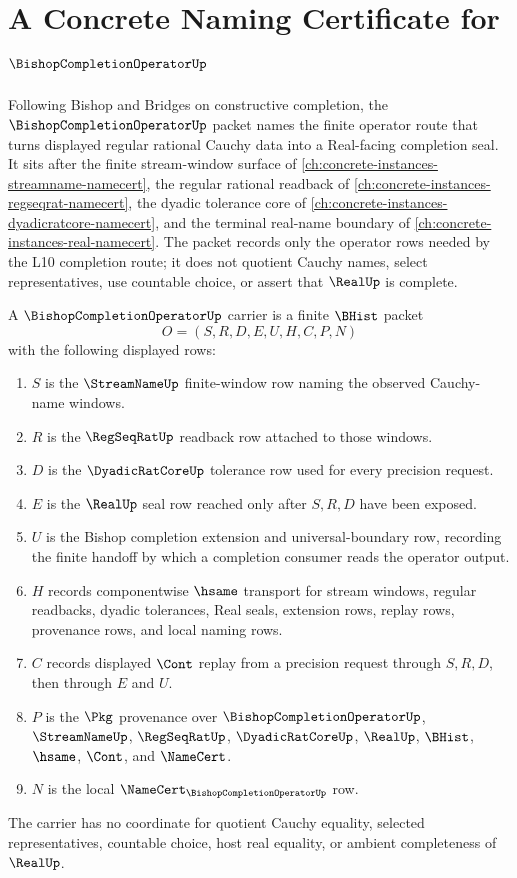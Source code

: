 \chapter{A Concrete Naming Certificate for $\BishopCompletionOperatorUp$}
\label{ch:concrete-instances-bishop-completion-operator-namecert}

Following Bishop and Bridges on constructive completion, the $\BishopCompletionOperatorUp$ packet names the finite operator route that turns displayed regular rational Cauchy data into a Real-facing completion seal. It sits after the finite stream-window surface of \autoref{ch:concrete-instances-streamname-namecert}, the regular rational readback of \autoref{ch:concrete-instances-regseqrat-namecert}, the dyadic tolerance core of \autoref{ch:concrete-instances-dyadicratcore-namecert}, and the terminal real-name boundary of \autoref{ch:concrete-instances-real-namecert}. The packet records only the operator rows needed by the L10 completion route; it does not quotient Cauchy names, select representatives, use countable choice, or assert that $\RealUp$ is complete.

\begin{definition}
\label{def:bishop-completion-operator-carrier}
A $\BishopCompletionOperatorUp$ carrier is a finite $\BHist$ packet
$$
O=(S,R,D,E,U,H,C,P,N)
$$
with the following displayed rows:
\begin{enumerate}
\item $S$ is the $\StreamNameUp$ finite-window row naming the observed Cauchy-name windows.
\item $R$ is the $\RegSeqRatUp$ readback row attached to those windows.
\item $D$ is the $\DyadicRatCoreUp$ tolerance row used for every precision request.
\item $E$ is the $\RealUp$ seal row reached only after $S,R,D$ have been exposed.
\item $U$ is the Bishop completion extension and universal-boundary row, recording the finite handoff by which a completion consumer reads the operator output.
\item $H$ records componentwise $\hsame$ transport for stream windows, regular readbacks, dyadic tolerances, Real seals, extension rows, replay rows, provenance rows, and local naming rows.
\item $C$ records displayed $\Cont$ replay from a precision request through $S,R,D$, then through $E$ and $U$.
\item $P$ is the $\Pkg$ provenance over $\BishopCompletionOperatorUp$, $\StreamNameUp$, $\RegSeqRatUp$, $\DyadicRatCoreUp$, $\RealUp$, $\BHist$, $\hsame$, $\Cont$, and $\NameCert$.
\item $N$ is the local $\NameCert_{\BishopCompletionOperatorUp}$ row.
\end{enumerate}
The carrier has no coordinate for quotient Cauchy equality, selected representatives, countable choice, host real equality, or ambient completeness of $\RealUp$.
\end{definition}

